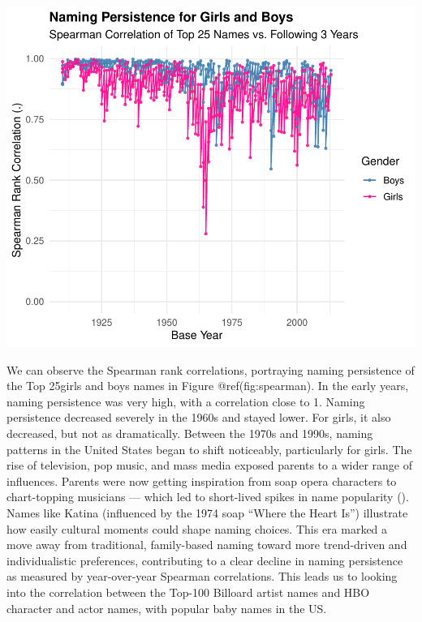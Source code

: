\documentclass[11pt,preprint]{elsarticle}
\let\origfigure\figure
\let\endorigfigure\endfigure
\renewenvironment{figure}[1][2] {
    \expandafter\origfigure\expandafter[H]
} {
    \endorigfigure
}
\numberwithin{equation}{section}
\numberwithin{figure}{section}
\numberwithin{table}{section}
\begin{document}
\begin{figure}
\centering
\includegraphics{Question1_files/figure-latex/fig.spearman-1.pdf}
\caption{Figure: Spearman correlation for naming persistence over time}
\end{figure}

We can observe the Spearman rank correlations, portraying naming
persistence of the Top 25girls and boys names in Figure
@ref(fig:spearman). In the early years, naming persistence was very
high, with a correlation close to 1. Naming persistence decreased
severely in the 1960s and stayed lower. For girls, it also decreased,
but not as dramatically. Between the 1970s and 1990s, naming patterns in
the United States began to shift noticeably, particularly for girls. The
rise of television, pop music, and mass media exposed parents to a wider
range of influences. Parents were now getting inspiration from soap
opera characters to chart-topping musicians --- which led to short-lived
spikes in name popularity
(). Names like
Katina (influenced by the 1974 soap ``Where the Heart Is'') illustrate
how easily cultural moments could shape naming choices. This era marked
a move away from traditional, family-based naming toward more
trend-driven and individualistic preferences, contributing to a clear
decline in naming persistence as measured by year-over-year Spearman
correlations. This leads us to looking into the correlation between the
Top-100 Billoard artist names and HBO character and actor names, with
popular baby names in the US.
\end{document}
